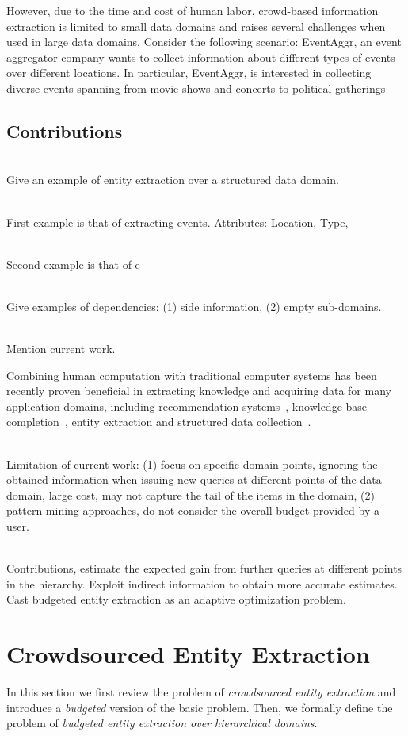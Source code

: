 \documentclass{sig-alternate}
\begin{document}
However, due to the time and cost of human labor, crowd-based information extraction is limited to small data domains and raises several challenges when used in large data domains. Consider the following scenario: EventAggr, an event aggregator company wants to collect information about different types of events over different locations. In particular, EventAggr, is interested in collecting diverse events spanning from movie shows and concerts to political gatherings 

\subsection{Contributions}

\ \\Give an example of entity extraction over a structured data domain.

\ \\First example is that of extracting events. Attributes: Location, Type, 

\ \\Second example is that of e

\ \\Give examples of dependencies: (1) side information, (2) empty sub-domains.

\ \\Mention current work.

Combining human computation with traditional computer systems has been recently proven beneficial in extracting knowledge and acquiring data for many application domains, including recommendation systems~\cite{amsterdamer:2014}, knowledge base completion~\cite{kondredi:2014, west:2014}, entity extraction and structured data collection~\cite{trushkowsky:2013, park:2014}. 

\ \\Limitation of current work: (1) focus on specific domain points, ignoring the obtained information when issuing new queries at different points of the data domain, large cost, may not capture the tail of the items in the domain, (2) pattern mining approaches, do not consider the overall budget provided by a user. 

\ \\Contributions, estimate the expected gain from further queries at different points in the hierarchy. Exploit indirect information to obtain more accurate estimates. Cast budgeted entity extraction as an adaptive optimization problem. 


\section{Crowdsourced Entity Extraction}
In this section we first review the problem of {\em crowdsourced entity extraction} and introduce a {\em budgeted} version of the basic problem. Then, we formally define the problem of {\em budgeted entity extraction over hierarchical domains}. 
\end{document}
